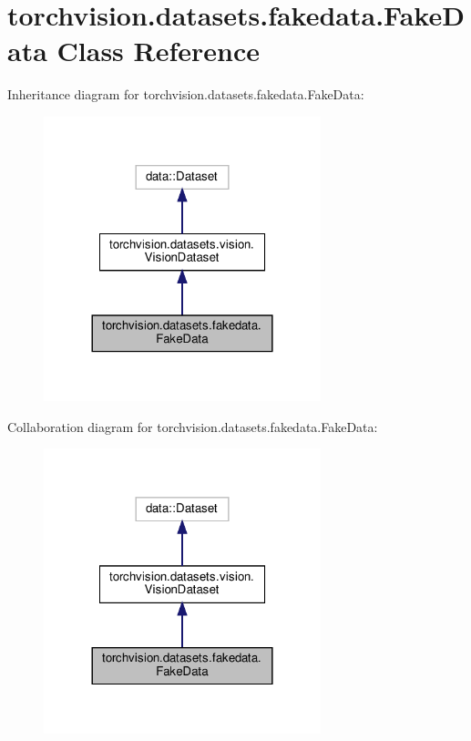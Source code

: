 \hypertarget{classtorchvision_1_1datasets_1_1fakedata_1_1FakeData}{}\section{torchvision.\+datasets.\+fakedata.\+Fake\+Data Class Reference}
\label{classtorchvision_1_1datasets_1_1fakedata_1_1FakeData}


Inheritance diagram for torchvision.\+datasets.\+fakedata.\+Fake\+Data\+:
\nopagebreak
\begin{figure}[H]
\begin{center}
\leavevmode
\includegraphics[width=228pt]{classtorchvision_1_1datasets_1_1fakedata_1_1FakeData__inherit__graph}
\end{center}
\end{figure}


Collaboration diagram for torchvision.\+datasets.\+fakedata.\+Fake\+Data\+:
\nopagebreak
\begin{figure}[H]
\begin{center}
\leavevmode
\includegraphics[width=228pt]{classtorchvision_1_1datasets_1_1fakedata_1_1FakeData__coll__graph}
\end{center}
\end{figure}
